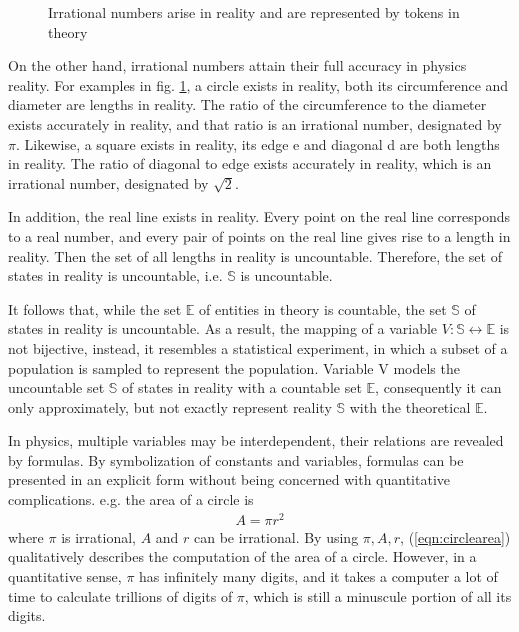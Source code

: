 \documentclass{amsart}
\theoremstyle{definition}
\theoremstyle{remark}
\numberwithin{equation}{section}
\begin{document}
\begin{figure}
\center
{}
\caption{Irrational numbers arise in reality and are represented by tokens in theory}
\label{fig:irrational}
\end{figure}
On the other hand, irrational numbers attain their full accuracy in physics reality. For examples in fig. \ref{fig:irrational}, a circle exists in reality, both its circumference and diameter are lengths in reality. The ratio of the circumference to the diameter exists accurately in reality, and that ratio is an irrational number, designated by $\pi$. Likewise, a square exists in reality, its edge e and diagonal d are both lengths in reality. The ratio of diagonal to edge exists accurately in reality, which is an irrational number, designated by $\sqrt 2$.

In addition, the real line exists in reality. Every point on the real line corresponds to a real number, and every pair of points on the real line gives rise to a length in reality. Then the set of all lengths in reality is uncountable. Therefore, the set of states in reality is uncountable, i.e. $\mathbb{S}$ is uncountable.

It follows that, while the set $\mathbb{E}$ of entities in theory is countable, the set $\mathbb{S}$ of states in reality is uncountable. As a result, the mapping of a variable $V: \mathbb{S}\leftrightarrow \mathbb{E}$ is not bijective, instead, it resembles a statistical experiment, in which a subset of a population is sampled to represent the population. Variable V models the uncountable set $\mathbb{S}$ of states in reality with a countable set $\mathbb{E}$, consequently it can only approximately, but not exactly represent reality $\mathbb{S}$ with the theoretical $\mathbb{E}$.

In physics, multiple variables may be interdependent, their relations are revealed by formulas. By symbolization of constants and variables, formulas can be presented in an explicit form without being concerned with quantitative complications. e.g. the area of a circle is
\begin{eqnarray}
A=\pi r^2
\label{eqn:circlearea}
\end{eqnarray}
where $\pi$ is irrational, $A$ and $r$ can be irrational. By using $\pi, A, r$, (\ref{eqn:circlearea}) qualitatively describes the computation of the area of a circle. However, in a quantitative sense, $\pi$ has infinitely many digits, and it takes a computer a lot of time to calculate trillions of digits of $\pi$, which is still a minuscule portion of all its digits.
\end{document}
